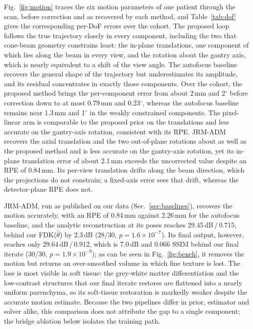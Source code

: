 \documentclass[11pt]{article}
\newcommand{\thetahat}{\hat\theta}
\begin{document}
Fig.~\ref{fig:motion} traces the six motion parameters of one patient through the scan,
before correction and as recovered by each method, and Table~\ref{tab:dof} gives the
corresponding per-DoF errors over the cohort. The proposed loop follows the true
trajectory closely in every component, including the two that cone-beam geometry
constrains least: the in-plane translations, one component of which lies along the beam
in every view, and the rotation about the gantry axis, which is nearly equivalent to a
shift of the view angle. The autofocus baseline recovers the general shape of the
trajectory but underestimates its amplitude, and its residual concentrates in exactly
those components. Over the cohort, the proposed method brings the per-component error
from about 2\,mm and 2$^\circ$ before correction down to at most 0.79\,mm and
0.23$^\circ$, whereas the autofocus baseline remains near 1.3\,mm and 1$^\circ$ in the
weakly constrained components. The pixel-linear arm is comparable to the proposed prior on the
translations and less accurate on the gantry-axis rotation, consistent with its RPE.
JRM-ADM recovers the axial translation and the two out-of-plane rotations about as well
as the proposed method and is less accurate on the gantry-axis rotation, yet its in-plane
translation error of about 2.1\,mm exceeds the uncorrected value despite an RPE of
0.84\,mm. Its per-view translation drifts
along the beam direction, which the projections do not constrain; a fixed-axis error sees
that drift, whereas the detector-plane RPE does not.

JRM-ADM, run as published on our data (Sec.~\ref{sec:baselines}), recovers the motion
accurately, with an RPE of 0.84\,mm against 2.26\,mm for the autofocus baseline, and the
analytic
reconstruction at its poses reaches 29.45\,dB\,/\,0.715, behind our
FDK($\thetahat$) by 2.3\,dB (28/30, $p=1.6\times10^{-7}$). Its final output,
however, reaches only 29.64\,dB\,/\,0.912, which is 7.0\,dB
and 0.066 SSIM behind our final iterate (30/30, $p=1.9\times10^{-9}$); as can be seen
in Fig.~\ref{fig:bench}, it removes the motion but returns an over-smoothed volume in
which fine texture is lost. The loss is most visible in soft tissue: the grey-white matter
differentiation and the low-contrast structures that our final iterate restores are
flattened into a nearly uniform parenchyma, so its soft-tissue restoration is markedly
weaker despite the accurate motion estimate. Because the two pipelines differ in prior,
estimator and solver alike, this comparison does not attribute the gap to a single
component; the bridge ablation below isolates the training path.
\end{document}
